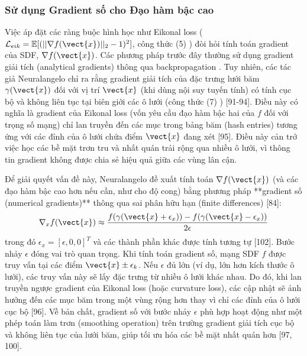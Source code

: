 \subsubsection{Sử dụng Gradient số cho Đạo hàm bậc cao}
\label{subsubsec:neuralangelo_numerical_grad}

Việc áp đặt các ràng buộc hình học như Eikonal loss ($\mathcal{L}_{eik} = \mathbb{E}[(||\nabla f(\vect{x})||_2 - 1)^2]$, công thức (5) \cite{Li23Neuralangelo}) đòi hỏi tính toán gradient của SDF, $\nabla f(\vect{x})$. Các phương pháp trước đây thường sử dụng gradient giải tích (analytical gradients) thông qua backpropagation \cite{Wang21NeuS, Yariv20IDR, Yariv21VolSDF, Yang21Geometry}. Tuy nhiên, các tác giả Neuralangelo chỉ ra rằng gradient giải tích của đặc trưng lưới băm $\gamma(\vect{x})$ đối với vị trí $\vect{x}$ (khi dùng nội suy tuyến tính) có tính cục bộ và không liên tục tại biên giới các ô lưới (công thức (7) \cite{Li23Neuralangelo}) [91-94]. Điều này có nghĩa là gradient của Eikonal loss (vốn yêu cầu đạo hàm bậc hai của $f$ đối với trọng số mạng) chỉ lan truyền đến các mục trong bảng băm (hash entries) tương ứng với các đỉnh của ô lưới chứa điểm $\vect{x}$ đang xét [95]. Điều này cản trở việc học các bề mặt trơn tru và nhất quán trải rộng qua nhiều ô lưới, vì thông tin gradient không được chia sẻ hiệu quả giữa các vùng lân cận.

Để giải quyết vấn đề này, Neuralangelo đề xuất tính toán $\nabla f(\vect{x})$ (và các đạo hàm bậc cao hơn nếu cần, như cho độ cong) bằng phương pháp **gradient số (numerical gradients)** thông qua sai phân hữu hạn (finite differences) [84]:
\begin{equation} \label{eq:numerical_gradient}
\nabla_x f(\vect{x}) \approx \frac{f(\gamma(\vect{x} + \epsilon_x)) - f(\gamma(\vect{x} - \epsilon_x))}{2\epsilon}
\end{equation}
trong đó $\epsilon_x = [\epsilon, 0, 0]^T$ và các thành phần khác được tính tương tự [102]. Bước nhảy $\epsilon$ đóng vai trò quan trọng. Khi tính toán gradient số, mạng SDF $f$ được truy vấn tại các điểm $\vect{x} \pm \epsilon_k$. Nếu $\epsilon$ đủ lớn (ví dụ, lớn hơn kích thước ô lưới), các truy vấn này sẽ lấy đặc trưng từ nhiều ô lưới khác nhau. Do đó, khi lan truyền ngược gradient của Eikonal loss (hoặc curvature loss), các cập nhật sẽ ảnh hưởng đến các mục băm trong một vùng rộng hơn thay vì chỉ các đỉnh của ô lưới cục bộ [96]. Về bản chất, gradient số với bước nhảy $\epsilon$ phù hợp hoạt động như một phép toán làm trơn (smoothing operation) trên trường gradient giải tích cục bộ và không liên tục của lưới băm, giúp tối ưu hóa các bề mặt nhất quán hơn [97, 100].

